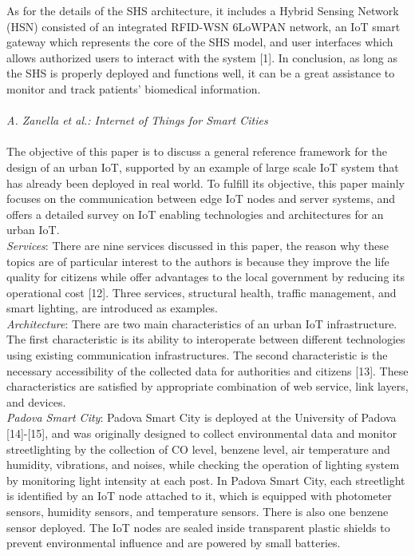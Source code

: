\documentclass[conference]{IEEEtran}
\begin{document}
\text{\quad} As for the details of the SHS architecture, it includes a Hybrid Sensing Network (HSN) consisted of an integrated
RFID-WSN 6LoWPAN network, an IoT smart gateway which represents the core of the SHS model, and user interfaces which allows authorized users to interact with the system [1].
\text{\quad} In conclusion, as long as the SHS is properly deployed and functions well, it can be a great assistance to monitor and track patients' biomedical information.
\\
\\
\textit{A. Zanella et al.: Internet of Things for Smart Cities}
\\
\\
\text{\quad} The objective of this paper is to discuss a general reference framework for the design of an urban IoT, supported by an example of large scale IoT system that has already been deployed in real world. To fulfill its objective, this paper mainly focuses on the communication between edge IoT nodes and server systems, and offers a detailed survey on IoT enabling technologies and architectures for an urban IoT.\\
\text{\quad} \textit{Services}: There are nine services discussed in this paper, the reason why these topics are of particular interest to the authors is because they improve the life quality for citizens while offer advantages to the local government by reducing its operational cost [12]. Three services, structural health, traffic management, and smart lighting, are introduced as examples.\\
\text{\quad} \textit{Architecture}: There are two main characteristics of an urban IoT infrastructure. The first characteristic is its ability to interoperate between different technologies using existing communication infrastructures. The second characteristic is the necessary accessibility of the collected data for authorities and citizens [13]. These characteristics are satisfied by appropriate combination of web service, link layers, and devices.\\
\text{\quad} \textit{Padova Smart City}: Padova Smart City is deployed at the University of Padova [14]-[15], and was originally designed to collect environmental data and monitor streetlighting by the collection of CO level, benzene level, air temperature and humidity, vibrations, and noises, while checking the operation of lighting system by monitoring light intensity at each post.
\text{\quad} In Padova Smart City, each streetlight is identified by an IoT node attached to it, which is equipped with photometer sensors, humidity sensors, and temperature sensors. There is also one benzene sensor deployed. The IoT nodes are sealed inside transparent plastic shields to prevent environmental influence and are powered by small batteries.
\end{document}
